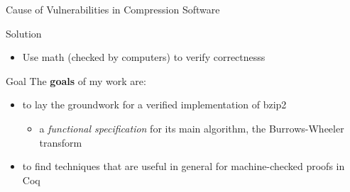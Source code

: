 \documentclass{beamer}
\begin{document}
  \begin{frame}{Cause of Vulnerabilities in Compression Software}
    \begin{figure}
    \end{figure}
  \end{frame}

  \begin{frame}{Solution}
    \begin{itemize}
    \item<2-> Use math (checked by computers) to verify correctnesss
    \end{itemize}
  \end{frame}

  \begin{frame}{Goal}
    The \textbf{goals} of my work are:
    \begin{itemize}
    \item<1-> to lay the groundwork for a verified implementation of
      bzip2
      \begin{itemize}
      \item<2-> a \textit{functional specification} for its main
        algorithm, the Burrows-Wheeler transform
      \end{itemize}
    \item<3-> to find techniques that are useful in general for
      machine-checked proofs in Coq
    \end{itemize}
  \end{frame}
\end{document}
